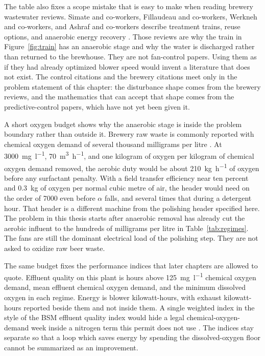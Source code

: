 The table also fixes a scope mistake that is easy to make when reading brewery wastewater reviews. Simate and co-workers, Fillaudeau and co-workers, Werkneh and co-workers, and Ashraf and co-workers describe treatment trains, reuse options, and anaerobic energy recovery \cite{simate2011,fillaudeau2006,werkneh2019,ashraf2021,shao2008asbr,chen2016anmbr}. Those reviews are why the train in Figure~\ref{fig:train} has an anaerobic stage and why the water is discharged rather than returned to the brewhouse. They are not fan-control papers. Using them as if they had already optimized blower speed would invent a literature that does not exist. The control citations and the brewery citations meet only in the problem statement of this chapter: the disturbance shape comes from the brewery reviews, and the mathematics that can accept that shape comes from the predictive-control papers, which have not yet been given it.

A short oxygen budget shows why the anaerobic stage is inside the problem boundary rather than outside it. Brewery raw waste is commonly reported with chemical oxygen demand of several thousand milligrams per litre \cite{simate2011,fillaudeau2006}. At \SI{3000}{\milli\gram\per\litre}, \SI{70}{\cubic\metre\per\hour}, and one kilogram of oxygen per kilogram of chemical oxygen demand removed, the aerobic duty would be about \SI{210}{\kilo\gram\per\hour} of oxygen before any surfactant penalty. With a field transfer efficiency near ten percent and \SI{0.3}{\kilo\gram} of oxygen per normal cubic metre of air, the header would need on the order of \SI{7000}{\nmcph} even before $\alpha$ falls, and several times that during a detergent hour. That header is a different machine from the polishing header specified here. The problem in this thesis starts after anaerobic removal has already cut the aerobic influent to the hundreds of milligrams per litre in Table~\ref{tab:regimes}. The fans are still the dominant electrical load of the polishing step. They are not asked to oxidize raw beer waste.

The same budget fixes the performance indices that later chapters are allowed to quote. Effluent quality on this plant is hours above \SI{125}{\milli\gram\per\litre} chemical oxygen demand, mean effluent chemical oxygen demand, and the minimum dissolved oxygen in each regime. Energy is blower kilowatt-hours, with exhaust kilowatt-hours reported beside them and not inside them. A single weighted index in the style of the BSM effluent quality index would hide a legal chemical-oxygen-demand week inside a nitrogen term this permit does not use \cite{copp2002cost,vanrolleghem2002,nopens2010bsm2}. The indices stay separate so that a loop which saves energy by spending the dissolved-oxygen floor cannot be summarized as an improvement.

